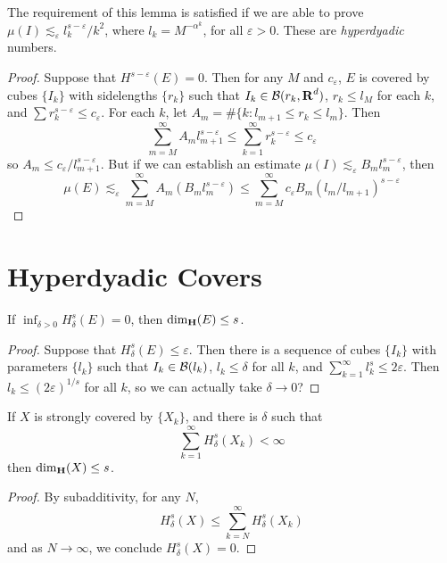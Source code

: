 The requirement of this lemma is satisfied if we are able to prove $\mu(I) \lesssim_\varepsilon l_k^{s - \varepsilon}/k^2$, where $l_k = M^{- \alpha^k}$, for all $\varepsilon > 0$. These are \emph{hyperdyadic} numbers.

\begin{proof}
	Suppose that $H^{s-\varepsilon}(E) = 0$. Then for any $M$ and $c_\varepsilon$, $E$ is covered by cubes $\{ I_k \}$ with sidelengths $\{ r_k \}$ such that $I_k \in \operatorname{\mathcal{B}}(r_k,\operatorname{\mathbf{R}}^d)$, $r_k \leq l_M$ for each $k$, and $\sum r_k^{s - \varepsilon} \leq c_\varepsilon$. For each $k$, let $A_m = \# \{ k: l_{m+1} \leq r_k \leq l_m \}$. Then
	\[ \sum_{m = M}^\infty A_m l_{m+1}^{s - \varepsilon} \leq \sum_{k = 1}^\infty r_k^{s - \varepsilon} \leq c_\varepsilon \]
	so $A_m \leq c_\varepsilon / l_{m+1}^{s-\varepsilon}$. But if we can establish an estimate $\mu(I) \lesssim_\varepsilon B_m l_m^{s - \varepsilon}$, then 
	\[ \mu(E) \lesssim_\varepsilon \sum_{m = M}^\infty A_m (B_m l_m^{s - \varepsilon}) \leq \sum_{m = M}^\infty c_\varepsilon B_m (l_m/l_{m+1})^{s - \varepsilon} \]
\end{proof}

\section{Hyperdyadic Covers}

\begin{theorem}
	If $\inf_{\delta > 0} H^s_\delta(E) = 0$, then $\operatorname{\dim_{\mathbf{H}}}(E) \leq s$.
\end{theorem}
\begin{proof}
	Suppose that $H^s_\delta(E) \leq \varepsilon$. Then there is a sequence of cubes $\{ I_k \}$ with parameters $\{ l_k \}$ such that $I_k \in \operatorname{\mathcal{B}}(l_k)$, $l_k \leq \delta$ for all $k$, and $\sum_{k = 1}^\infty l_k^s \leq 2\varepsilon$. Then $l_k \leq (2\varepsilon)^{1/s}$ for all $k$, so we can actually take $\delta \to 0$?
\end{proof}

\begin{theorem}
	If $X$ is strongly covered by $\{ X_k \}$, and there is $\delta$ such that
	\[ \sum_{k = 1}^\infty H^s_\delta(X_k) < \infty \]
	then $\operatorname{\dim_{\mathbf{H}}}(X) \leq s$.
\end{theorem}
\begin{proof}
	By subadditivity, for any $N$,
	\[ H^s_\delta(X) \leq \sum_{k = N}^\infty H^s_\delta(X_k) \]
	and as $N \to \infty$, we conclude $H^s_\delta(X) = 0$.
\end{proof}

